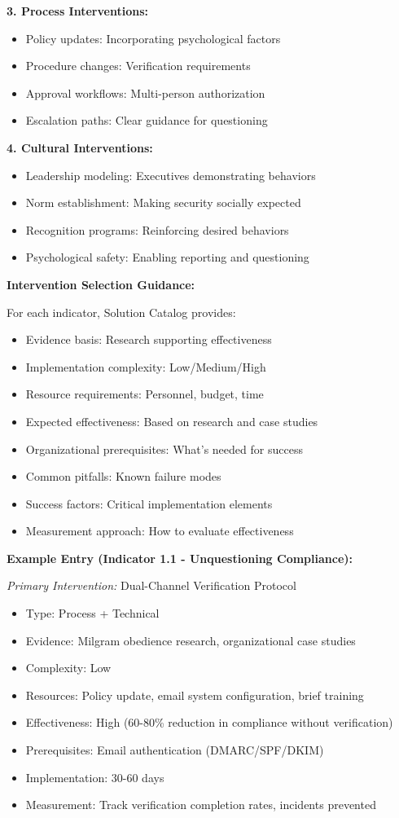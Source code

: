 \documentclass[11pt,a4paper]{article}
\begin{document}
\textbf{3. Process Interventions:}
\begin{itemize}
\item Policy updates: Incorporating psychological factors
\item Procedure changes: Verification requirements
\item Approval workflows: Multi-person authorization
\item Escalation paths: Clear guidance for questioning
\end{itemize}

\textbf{4. Cultural Interventions:}
\begin{itemize}
\item Leadership modeling: Executives demonstrating behaviors
\item Norm establishment: Making security socially expected
\item Recognition programs: Reinforcing desired behaviors
\item Psychological safety: Enabling reporting and questioning
\end{itemize}

\textbf{Intervention Selection Guidance:}

For each indicator, Solution Catalog provides:
\begin{itemize}
\item Evidence basis: Research supporting effectiveness
\item Implementation complexity: Low/Medium/High
\item Resource requirements: Personnel, budget, time
\item Expected effectiveness: Based on research and case studies
\item Organizational prerequisites: What's needed for success
\item Common pitfalls: Known failure modes
\item Success factors: Critical implementation elements
\item Measurement approach: How to evaluate effectiveness
\end{itemize}

\textbf{Example Entry (Indicator 1.1 - Unquestioning Compliance):}

\textit{Primary Intervention:} Dual-Channel Verification Protocol
\begin{itemize}
\item Type: Process + Technical
\item Evidence: Milgram obedience research, organizational case studies
\item Complexity: Low
\item Resources: Policy update, email system configuration, brief training
\item Effectiveness: High (60-80\% reduction in compliance without verification)
\item Prerequisites: Email authentication (DMARC/SPF/DKIM)
\item Implementation: 30-60 days
\item Measurement: Track verification completion rates, incidents prevented
\end{itemize}
\end{document}
